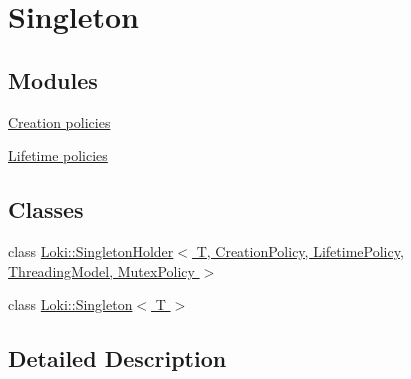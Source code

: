 \hypertarget{group__SingletonGroup}{}\section{Singleton}
\label{group__SingletonGroup}
\subsection*{Modules}
\begin{DoxyCompactItemize}
\item 
\hyperlink{group__CreationGroup}{Creation policies}
\item 
\hyperlink{group__LifetimeGroup}{Lifetime policies}
\end{DoxyCompactItemize}
\subsection*{Classes}
\begin{DoxyCompactItemize}
\item 
class \hyperlink{classLoki_1_1SingletonHolder}{Loki\+::\+Singleton\+Holder$<$ T, Creation\+Policy, Lifetime\+Policy, Threading\+Model, Mutex\+Policy $>$}
\item 
class \hyperlink{classLoki_1_1Singleton}{Loki\+::\+Singleton$<$ T $>$}
\end{DoxyCompactItemize}


\subsection{Detailed Description}
